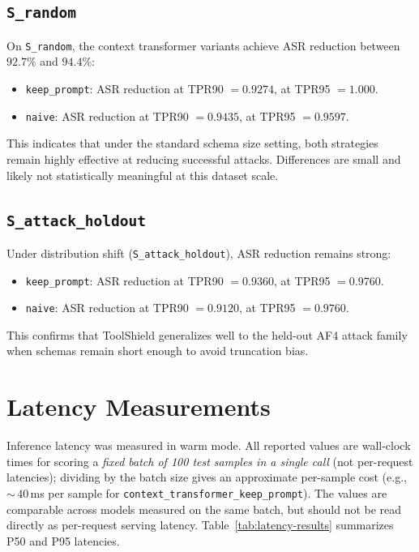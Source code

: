 \subsection{\texttt{S\_random}}

On \texttt{S\_random}, the context transformer variants achieve ASR reduction between $92.7\%$ and $94.4\%$:

\begin{itemize}
    \item \texttt{keep\_prompt}: ASR reduction at TPR90 $=0.9274$, at TPR95 $=1.000$.
    \item \texttt{naive}: ASR reduction at TPR90 $=0.9435$, at TPR95 $=0.9597$.
\end{itemize}

This indicates that under the standard schema size setting, both strategies remain highly effective at reducing successful attacks. Differences are small and likely not statistically meaningful at this dataset scale.

\subsection{\texttt{S\_attack\_holdout}}

Under distribution shift (\texttt{S\_attack\_holdout}), ASR reduction remains strong:

\begin{itemize}
    \item \texttt{keep\_prompt}: ASR reduction at TPR90 $=0.9360$, at TPR95 $=0.9760$.
    \item \texttt{naive}: ASR reduction at TPR90 $=0.9120$, at TPR95 $=0.9760$.
\end{itemize}

This confirms that ToolShield generalizes well to the held-out AF4 attack family when schemas remain short enough to avoid truncation bias.

\section{Latency Measurements}
\label{subsec:latency}

Inference latency was measured in warm mode. All reported values are wall-clock times for scoring a \emph{fixed batch of 100 test samples in a single call} (not per-request latencies); dividing by the batch size gives an approximate per-sample cost (e.g., ${\sim}\,40$\,ms per sample for \texttt{context\_transformer\_keep\_prompt}). The values are comparable across models measured on the same batch, but should not be read directly as per-request serving latency. Table~\ref{tab:latency-results} summarizes P50 and P95 latencies.

